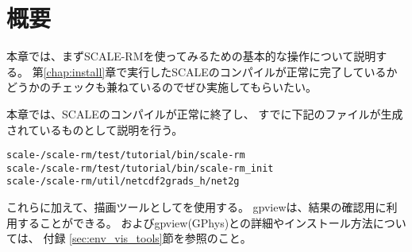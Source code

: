 \section{概要} \label{sec:ideal_exp_intro}

本章では、まずSCALE-RMを使ってみるための基本的な操作について説明する。
第\ref{chap:install}章で実行したSCALEのコンパイルが正常に完了しているか
どうかのチェックも兼ねているのでぜひ実施してもらいたい。




本章では、SCALEのコンパイルが正常に終了し、
すでに下記のファイルが生成されているものとして説明を行う。
\begin{alltt} 
  scale-{\version}/scale-rm/test/tutorial/bin/scale-rm
  scale-{\version}/scale-rm/test/tutorial/bin/scale-rm_init
  scale-{\version}/scale-rm/util/netcdf2grads_h/net2g
\end{alltt}
これらに加えて、描画ツールとして\grads を使用する。
gpviewは、結果の確認用に利用することができる。
\grads およびgpview(GPhys)との詳細やインストール方法については、
付録 \ref{sec:env_vis_tools}節を参照のこと。




